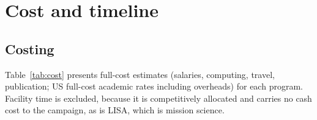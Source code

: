 \documentclass[11pt]{article}
\begin{document}
\section{Cost and timeline}
\label{sec:cost}

\subsection{Costing}

Table~\ref{tab:cost} presents full-cost estimates (salaries, computing, travel, publication; US full-cost academic rates including overheads) for each program. Facility time is excluded, because it is competitively allocated and carries no cash cost to the campaign, as is LISA, which is mission science.
\end{document}
